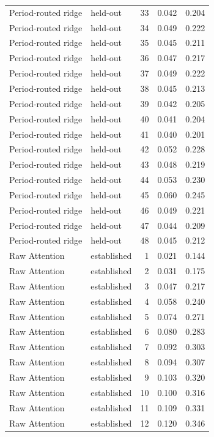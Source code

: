 \begin{tabular}{llrrr}
Period-routed ridge & held-out & 33 & 0.042 & 0.204 \\
Period-routed ridge & held-out & 34 & 0.049 & 0.222 \\
Period-routed ridge & held-out & 35 & 0.045 & 0.211 \\
Period-routed ridge & held-out & 36 & 0.047 & 0.217 \\
Period-routed ridge & held-out & 37 & 0.049 & 0.222 \\
Period-routed ridge & held-out & 38 & 0.045 & 0.213 \\
Period-routed ridge & held-out & 39 & 0.042 & 0.205 \\
Period-routed ridge & held-out & 40 & 0.041 & 0.204 \\
Period-routed ridge & held-out & 41 & 0.040 & 0.201 \\
Period-routed ridge & held-out & 42 & 0.052 & 0.228 \\
Period-routed ridge & held-out & 43 & 0.048 & 0.219 \\
Period-routed ridge & held-out & 44 & 0.053 & 0.230 \\
Period-routed ridge & held-out & 45 & 0.060 & 0.245 \\
Period-routed ridge & held-out & 46 & 0.049 & 0.221 \\
Period-routed ridge & held-out & 47 & 0.044 & 0.209 \\
Period-routed ridge & held-out & 48 & 0.045 & 0.212 \\
Raw Attention & established & 1 & 0.021 & 0.144 \\
Raw Attention & established & 2 & 0.031 & 0.175 \\
Raw Attention & established & 3 & 0.047 & 0.217 \\
Raw Attention & established & 4 & 0.058 & 0.240 \\
Raw Attention & established & 5 & 0.074 & 0.271 \\
Raw Attention & established & 6 & 0.080 & 0.283 \\
Raw Attention & established & 7 & 0.092 & 0.303 \\
Raw Attention & established & 8 & 0.094 & 0.307 \\
Raw Attention & established & 9 & 0.103 & 0.320 \\
Raw Attention & established & 10 & 0.100 & 0.316 \\
Raw Attention & established & 11 & 0.109 & 0.331 \\
Raw Attention & established & 12 & 0.120 & 0.346 \\

\end{tabular}
